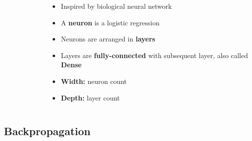 \documentclass[aspectratio=169]{beamer}
\begin{document}
\begin{frame}
\begin{columns}
\begin{column}{0.48\textwidth}
\begin{figure}
        \end{figure}
    \end{column}
    \begin{column}{0.48\textwidth}
        \begin{itemize}
            \item Inspired by biological neural network
            \item A \textbf{neuron} is a logistic regression
            \item Neurons are arranged in \textbf{layers}
            \item Layers are \textbf{fully-connected} with subsequent layer, also called \textbf{Dense}
            \item \textbf{Width:} neuron count
            \item \textbf{Depth:} layer count
        \end{itemize}
    \end{column}
\end{columns}
\end{frame}

\subsection{Backpropagation}
\label{subsec:backpropagation}
\end{document}
